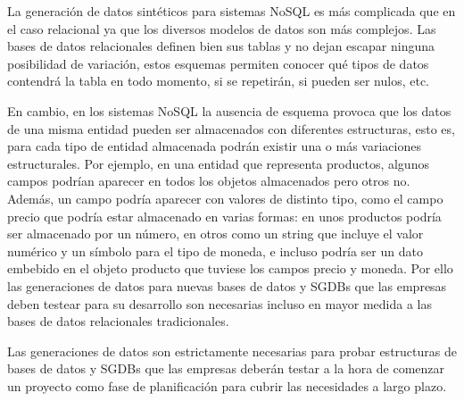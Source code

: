 La generación de datos sintéticos para sistemas NoSQL es más complicada que en el caso relacional ya que los diversos modelos de datos son más complejos. Las bases de datos relacionales definen bien sus tablas y no dejan escapar ninguna posibilidad de variación, estos esquemas permiten conocer qué tipos de datos contendrá la tabla en todo momento, si se repetirán, si pueden ser nulos, etc.


En cambio, en los sistemas NoSQL la ausencia de esquema provoca que los datos de una misma entidad pueden ser almacenados con diferentes estructuras, esto es, para cada tipo de entidad almacenada podrán existir una o más variaciones estructurales. Por ejemplo, en una entidad que representa productos, algunos campos podrían aparecer en todos los objetos almacenados pero otros no. Además, un campo podría aparecer con valores de distinto tipo, como el campo precio que podría estar almacenado en varias formas: en unos productos podría ser almacenado por un número, en otros como un string que incluye el valor numérico y un símbolo para el tipo de moneda, e incluso podría ser un dato embebido en el objeto producto que tuviese los campos precio y moneda. Por ello las generaciones de datos para nuevas bases de datos y SGDBs que las empresas deben testear para su desarrollo son necesarias incluso en mayor medida a las bases de datos relacionales tradicionales.

Las generaciones de datos son estrictamente necesarias para probar estructuras de bases de datos y SGDBs que las empresas deberán testar a la hora de comenzar un 
proyecto como fase de planificación para cubrir las necesidades a largo plazo.


